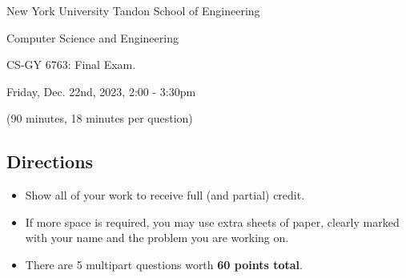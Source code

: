 \documentclass[10pt]{article}
\begin{document}
	
\begin{center}
	\normalsize
	New York University Tandon School of Engineering
	
	Computer Science and Engineering
	\medskip
	
	\large
	CS-GY 6763: Final Exam. 
	
	Friday, Dec. 22nd, 2023, 2:00 - 3:30pm 
	
	(90 minutes, 18 minutes per question)
	\medskip
\end{center} 

\vspace{-3em}
\subsection{Directions}
\begin{itemize}
	\item Show all of your work to receive full (and partial) credit.
	\item If more space is required, you may use extra sheets of paper, clearly marked with your name and the problem you are working on.
	\item There are 5 multipart questions worth \textbf{60 points total}. 
\end{itemize}
\end{document}
